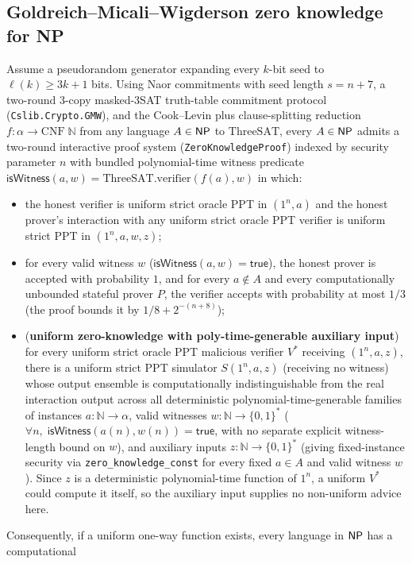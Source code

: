 \begin{result}
\subsection{Goldreich--Micali--Wigderson zero knowledge for NP}
Assume a pseudorandom generator expanding every $k$-bit seed to $\ell(k)\ge 3k+1$ bits.
Using Naor commitments with seed length $s=n+7$, a two-round 3-copy masked-3SAT truth-table
commitment protocol (\texttt{Cslib.Crypto.GMW}), and the Cook--Levin plus clause-splitting
reduction $f:\alpha\to\mathrm{CNF}\;\mathbb N$ from any language $A\in\mathsf{NP}$ to $\mathrm{ThreeSAT}$,
every $A\in\mathsf{NP}$ admits a two-round interactive proof system (\texttt{ZeroKnowledgeProof}) indexed
by security parameter $n$ with bundled polynomial-time witness predicate
$\mathsf{isWitness}(a,w)=\mathrm{ThreeSAT.verifier}(f(a),w)$ in which:
\begin{itemize}
\item the honest verifier is uniform strict oracle PPT in $(1^n,a)$ and the honest
  prover's interaction with any uniform strict oracle PPT verifier is uniform strict
  PPT in $(1^n,a,w,z)$;
\item for every valid witness $w$ ($\mathsf{isWitness}(a,w)=\mathsf{true}$), the honest prover is
  accepted with probability $1$, and for every $a\notin A$ and every computationally
  unbounded stateful prover $P$, the verifier accepts with probability at most $1/3$ (the
  proof bounds it by $1/8+2^{-(n+8)}$);
\item (\textbf{uniform zero-knowledge with poly-time-generable auxiliary input}) for every uniform
  strict oracle PPT malicious verifier $V^*$ receiving $(1^n,a,z)$, there is a uniform strict PPT
  simulator $S(1^n,a,z)$ (receiving no witness) whose output ensemble is computationally
  indistinguishable from the real interaction output across all deterministic
  polynomial-time-generable families of instances $a:\mathbb N\to\alpha$, valid witnesses
  $w:\mathbb N\to\{0,1\}^*$ ($\forall n,\;\mathsf{isWitness}(a(n),w(n))=\mathsf{true}$, with no
  separate explicit witness-length bound on $w$), and auxiliary inputs $z:\mathbb N\to\{0,1\}^*$
  (giving fixed-instance security via \texttt{zero\_knowledge\_const} for every fixed $a\in A$ and
  valid witness $w$). Since $z$ is a deterministic polynomial-time function of $1^n$, a uniform
  $V^*$ could compute it itself, so the auxiliary input supplies no non-uniform advice here.
\end{itemize}
Consequently, if a uniform one-way function exists, every language in $\mathsf{NP}$ has a computational

\end{result}
